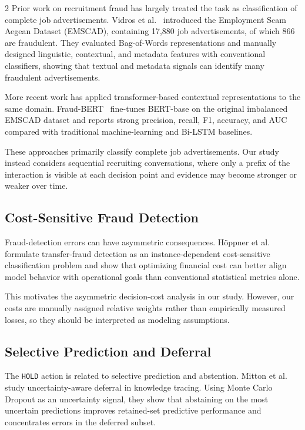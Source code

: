 \documentclass{article}
\begin{document}
\begin{multicols}{2}
Prior work on recruitment fraud has largely treated the task as classification of complete job advertisements. Vidros et al.~\cite{vidros2017recruitment} introduced the Employment Scam Aegean Dataset (EMSCAD), containing 17,880 job advertisements, of which 866 are fraudulent. They evaluated Bag-of-Words representations and manually designed linguistic, contextual, and metadata features with conventional classifiers, showing that textual and metadata signals can identify many fraudulent advertisements.

More recent work has applied transformer-based contextual representations to the same domain. Fraud-BERT~\cite{taneja2025fraudbert} fine-tunes BERT-base on the original imbalanced EMSCAD dataset and reports strong precision, recall, F1, accuracy, and AUC compared with traditional machine-learning and Bi-LSTM baselines.

These approaches primarily classify complete job advertisements. Our study instead considers sequential recruiting conversations, where only a prefix of the interaction is visible at each decision point and evidence may become stronger or weaker over time.

\subsection{Cost-Sensitive Fraud Detection}

Fraud-detection errors can have asymmetric consequences. H{\"o}ppner et al.~\cite{hoppner2022cost} formulate transfer-fraud detection as an instance-dependent cost-sensitive classification problem and show that optimizing financial cost can better align model behavior with operational goals than conventional statistical metrics alone.

This motivates the asymmetric decision-cost analysis in our study. However, our costs are manually assigned relative weights rather than empirically measured losses, so they should be interpreted as modeling assumptions.

\subsection{Selective Prediction and Deferral}

The \texttt{HOLD} action is related to selective prediction and abstention. Mitton et al.~\cite{mitton2026defer} study uncertainty-aware deferral in knowledge tracing. Using Monte Carlo Dropout as an uncertainty signal, they show that abstaining on the most uncertain predictions improves retained-set predictive performance and concentrates errors in the deferred subset.


\end{multicols}
\end{document}
